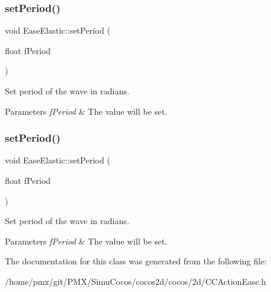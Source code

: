 \mbox{\label{classEaseElastic_a39cf4fafe8c792cd81d0bf48eaa11f34}} 
\subsubsection{\texorpdfstring{set\+Period()}{setPeriod()}\hspace{0.1cm}{\footnotesize\ttfamily [1/2]}}
{\footnotesize\ttfamily void Ease\+Elastic\+::set\+Period (\begin{DoxyParamCaption}\item[{float}]{f\+Period }\end{DoxyParamCaption})\hspace{0.3cm}{\ttfamily [inline]}}



Set period of the wave in radians. 


\begin{DoxyParams}{Parameters}
{\em f\+Period} & The value will be set. \\
\hline
\end{DoxyParams}
\mbox{\label{classEaseElastic_a39cf4fafe8c792cd81d0bf48eaa11f34}} 
\subsubsection{\texorpdfstring{set\+Period()}{setPeriod()}\hspace{0.1cm}{\footnotesize\ttfamily [2/2]}}
{\footnotesize\ttfamily void Ease\+Elastic\+::set\+Period (\begin{DoxyParamCaption}\item[{float}]{f\+Period }\end{DoxyParamCaption})\hspace{0.3cm}{\ttfamily [inline]}}



Set period of the wave in radians. 


\begin{DoxyParams}{Parameters}
{\em f\+Period} & The value will be set. \\
\hline
\end{DoxyParams}


The documentation for this class was generated from the following file\+:\begin{DoxyCompactItemize}
\item 
/home/pmx/git/\+P\+M\+X/\+Simu\+Cocos/cocos2d/cocos/2d/C\+C\+Action\+Ease.\+h\end{DoxyCompactItemize}
